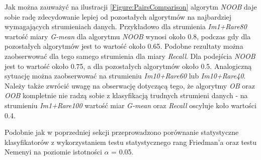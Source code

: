 \noindent Jak można zauważyć na ilustracji \ref{Figure:PairsComparison} algorytm \textit{NOOB} daje sobie radę zdecydowanie lepiej od pozostałych algorytmów na najbardziej wymagających strumieniach danych. Przykładowo dla strumienia \textit{Im1+Rare80} wartość miary \textit{G-mean} dla algorytmu \textit{NOOB} wynosi około 0.8, podczas gdy dla pozostałych algorytmów jest to wartość około 0.65. Podobne rezultaty można zaobserwować dla tego samego strumienia dla miary \textit{Recall}. Dla podejścia \textit{NOOB} jest to wartość około 0.75, a dla pozostałych algorytmów około 0.5. Analogiczną sytuację można zaobserwować na strumieniu \textit{Im10+Rare60} lub \textit{Im10+Rare40}. Należy także zwrócić uwagę na obserwację dotyczącą tego, że algorytmy \textit{OB} oraz \textit{OOB} kompletnie nie radzą sobie z klasyfikacją trudnych strumieni danych - na strumieniu \textit{Im1+Rare100} wartość miar \textit{G-mean} oraz \textit{Recall} oscyluje koło wartości 0.4.

Podobnie jak w poprzedniej sekcji przeprowadzono porównanie statystyczne klasyfikatorów z wykorzystaniem testu statystycznego rang Friedman'a oraz testu Nemenyi na poziomie istotności $\alpha$ = 0.05.

\newpage

